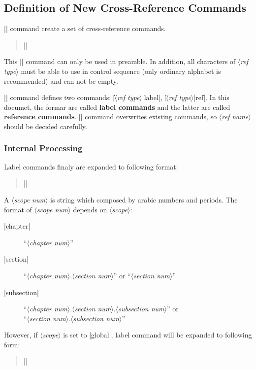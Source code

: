 \documentclass[a4paper]{article}
\newcommand{\Meta}[1]{$\langle$\mbox{}\textit{#1}\mbox{}$\rangle$}
\newenvironment{syntax}{\begin{quote}\small}{\end{quote}}
\begin{document}
\subsection{Definition of New Cross-Reference Commands}

|\newref| command create a set of cross-reference commands.
%
\begin{syntax}
|\newref{|\Meta{ref type}|}|
\end{syntax}
%
This |\newref| command can only be used in preamble. In addition, all characters of
\Meta{ref type} must be able to use in control sequence (only ordinary alphabet is recommended)
and can not be empty.

|\newref| command defines two commands: |\|\Meta{ref type}|label|, |\|\Meta{ref type}|ref|.
In this documet, the formar are called \textbf{label commands} and the latter are called
\textbf{reference commands}. |\newref| command overwrites existing commands, so \Meta{ref name}
should be decided carefully.

\subsubsection{Internal Processing}

Label commands finaly are expanded to following format:
%
\begin{syntax}
|\label{|\Meta{ref type}|:|\Meta{scope num}|:|\Meta{label}|}|
\end{syntax}

A \Meta{scope num} is string which composed by arabic numbers and periods.
The format of \Meta{scope num} depends on \Meta{scope}:
%
\begin{description}
\item[|chapter|]
``\Meta{chapter num}''

\item[|section|]
``\Meta{chapter num}.\Meta{section num}'' or ``\Meta{section num}''

\item[|subsection|]
``\Meta{chapter num}.\Meta{section num}.\Meta{subsection num}'' or \\
``\Meta{section num}.\Meta{subsection num}''
\end{description}

However, if \Meta{scope} is set to |global|, label command will be expanded to following form:
%
\begin{syntax}
|\label{|\Meta{ref type}|:|\Meta{label}|}|
\end{syntax}
\end{document}
